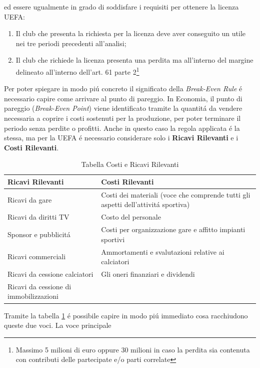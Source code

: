 \documentclass[
    corpo=12pt,
    oneside,
    evenboxes,
    tipotesi=triennale,
    stile=classica,
    oldstyle,
    autoretitolo,
    greek,
]{toptesi}
\begin{document}
\begin{interlinea}{1.5}
ed essere ugualmente in grado di soddisfare i requisiti per ottenere la licenza UEFA:
\begin{enumerate}
    \item Il club che presenta la richiesta per la licenza deve aver conseguito un utile nei tre periodi precedenti all'analisi;
    \item Il club che richiede la licenza presenta una perdita ma all'interno del margine delineato all'interno dell'art. 61 parte 2\footnote{Massimo 5 milioni di euro oppure 30 milioni in caso la perdita sia contenuta con contributi delle partecipate e/o parti correlate}
\end{enumerate}
Per poter spiegare in modo pi\'u concreto il significato della \emph{Break-Even Rule} \'e necessario capire come arrivare al punto di pareggio.
In Economia, il punto di pareggio (\emph{Break-Even Point}) viene identificato tramite la quantit\'a da vendere necessaria a coprire i costi 
sostenuti per la produzione, per poter terminare il periodo senza perdite o profitti. Anche in questo caso la regola applicata \'e la stessa,
ma per la UEFA \'e necessario considerare solo i \textbf{Ricavi Rilevanti} e i \textbf{Costi Rilevanti}.
\newpage
\begin{table}
    \begin{tabularx}{\textwidth}{XX}
        \toprule
        \textbf{Ricavi Rilevanti} & \textbf{Costi Rilevanti} \\
        \midrule
        Ricavi da gare & Costi dei materiali (voce che comprende tutti gli aspetti dell'attivit\'a sportiva) \\
        \midrule
        Ricavi da diritti TV & Costo del personale \\
        \midrule
        Sponsor e pubblicit\'a & Costi per organizzazione gare e affitto impianti sportivi \\
        \midrule
        Ricavi commerciali & Ammortamenti e svalutazioni relative ai calciatori \\
        \midrule
        Ricavi da cessione calciatori & Gli oneri finanziari e dividendi \\
        \midrule
        Ricavi da cessione di immobilizzazioni & \\
        \bottomrule
    \end{tabularx}
    \caption{Tabella Costi e Ricavi Rilevanti}
    \label{tabella_ric_costi_ril}
\end{table} 
Tramite la tabella \ref{tabella_ric_costi_ril} \'e possibile capire in modo pi\'u immediato cosa racchiudono queste due voci. La voce principale 

\end{interlinea}
\end{document}
